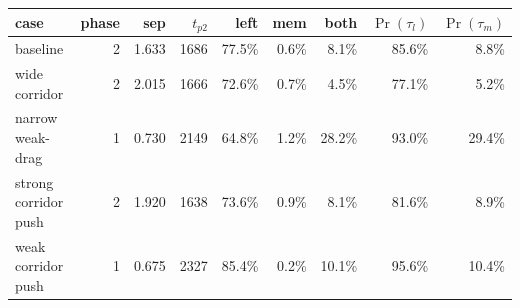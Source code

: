 \begin{tabular}{lrrrrrrrr}
\toprule
case & phase & sep & $t_{p2}$ & left & mem & both & $\Pr(\tau_l)$ & $\Pr(\tau_m)$ \\
\midrule
baseline & 2 & 1.633 & 1686 & 77.5\% & 0.6\% & 8.1\% & 85.6\% & 8.8\% \\
wide corridor & 2 & 2.015 & 1666 & 72.6\% & 0.7\% & 4.5\% & 77.1\% & 5.2\% \\
narrow weak-drag & 1 & 0.730 & 2149 & 64.8\% & 1.2\% & 28.2\% & 93.0\% & 29.4\% \\
strong corridor push & 2 & 1.920 & 1638 & 73.6\% & 0.9\% & 8.1\% & 81.6\% & 8.9\% \\
weak corridor push & 1 & 0.675 & 2327 & 85.4\% & 0.2\% & 10.1\% & 95.6\% & 10.4\% \\
\bottomrule
\end{tabular}
